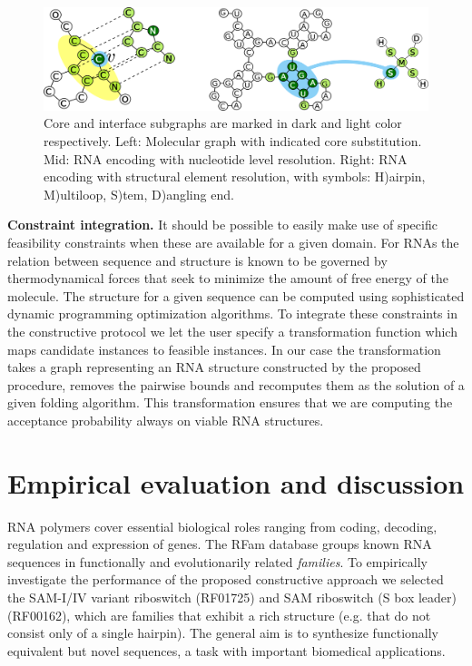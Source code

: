 \documentclass[a4paper]{esannV2}
\begin{document}
\begin{figure}[ht]
      \centering
        \includegraphics[width=0.7\linewidth]{images/allcipsinone.png}
      \caption{
      Core and interface subgraphs are marked in dark and light color
      respectively. Left: Molecular graph with indicated core substitution.
      Mid: RNA encoding with nucleotide level resolution.  Right:  
      RNA encoding with structural element resolution, with symbols: 
      H)airpin, M)ultiloop, S)tem, D)angling end.}
      \label{allcips}
\end{figure}


\textbf{Constraint integration.} It should be possible to easily make use of
specific feasibility constraints when these are available for a given domain.
For RNAs the relation between sequence and structure is known to be governed
by thermodynamical forces that seek to minimize the amount of free energy of
the molecule. The structure for a given sequence can be computed using
sophisticated dynamic programming optimization algorithms. To integrate these
constraints in the constructive protocol we let the user specify a
transformation function which maps candidate instances to feasible instances.
In our case the transformation takes a graph representing an RNA structure
constructed by the proposed procedure, removes the pairwise bounds and
recomputes them as the solution of a given folding algorithm. This
transformation ensures that we are computing the acceptance probability always
on viable RNA structures.


\section{Empirical evaluation and discussion}

RNA polymers cover essential biological roles ranging from coding, decoding,
regulation and expression of genes. The RFam database \citep{rfam} groups
known RNA sequences in functionally and evolutionarily related {\em families}. To
empirically investigate the performance of the proposed constructive approach
we selected the SAM-I/IV variant riboswitch (RF01725) and SAM riboswitch (S
box leader) (RF00162), which are families that exhibit a rich structure (e.g.
that do not consist only of a single hairpin). The general aim is to
synthesize functionally equivalent but novel sequences, a task with important
biomedical applications.
\end{document}
